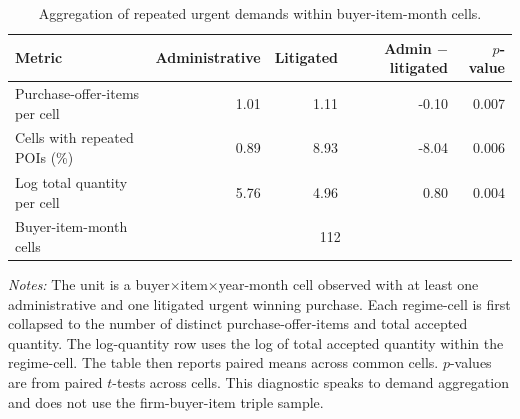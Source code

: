 \begin{table}[ht]
\centering
\caption{Aggregation of repeated urgent demands within buyer-item-month cells.}
\label{tab:aggregation_cells}
\begin{threeparttable}
\small
\begin{tabular}{lrrrr}
\toprule
Metric & Administrative & Litigated & Admin $-$ litigated & $p$-value \\
\midrule
Purchase-offer-items per cell & 1.01 & 1.11 & -0.10 & 0.007 \\
Cells with repeated POIs (\%) & 0.89 & 8.93 & -8.04 & 0.006 \\
Log total quantity per cell & 5.76 & 4.96 & 0.80 & 0.004 \\
\midrule
Buyer-item-month cells & \multicolumn{4}{c}{112} \\
\bottomrule
\end{tabular}
\begin{tablenotes}[flushleft]\footnotesize
\item \textit{Notes:} The unit is a buyer$\times$item$\times$year-month cell observed with at least one administrative and one litigated urgent winning purchase. Each regime-cell is first collapsed to the number of distinct purchase-offer-items and total accepted quantity. The log-quantity row uses the log of total accepted quantity within the regime-cell. The table then reports paired means across common cells. $p$-values are from paired $t$-tests across cells. This diagnostic speaks to demand aggregation and does not use the firm-buyer-item triple sample.
\end{tablenotes}
\end{threeparttable}
\end{table}
